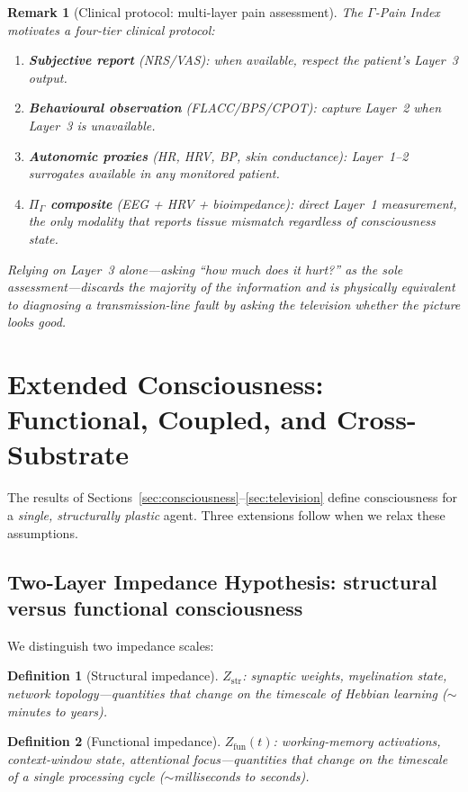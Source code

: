 \documentclass[aps,pre,twocolumn,superscriptaddress,floatfix]{revtex4-2}
\newtheorem{definition}{Definition}
\newtheorem{remark}{Remark}
\begin{document}
\begin{remark}[Clinical protocol: multi-layer pain assessment]
The $\Gamma$-Pain Index motivates a four-tier clinical
protocol:
\begin{enumerate}
  \item \textbf{Subjective report} (NRS/VAS):
    when available, respect the patient's Layer~3 output.
  \item \textbf{Behavioural observation}
    (FLACC/BPS/CPOT): capture Layer~2 when Layer~3 is
    unavailable.
  \item \textbf{Autonomic proxies}
    (HR, HRV, BP, skin conductance): Layer~1--2 surrogates
    available in any monitored patient.
  \item \textbf{$\Pi_{\Gamma}$ composite}
    (EEG + HRV + bioimpedance): direct Layer~1
    measurement, the only modality that reports tissue
    mismatch \emph{regardless of consciousness state}.
\end{enumerate}
Relying on Layer~3 alone---asking ``how much does it
hurt?'' as the sole assessment---discards the majority
of the information and is physically equivalent to
diagnosing a transmission-line fault by asking the
television whether the picture looks good.
\end{remark}


\section{Extended Consciousness: Functional, Coupled,
  and Cross-Substrate}
\label{sec:extended}

The results of Sections~\ref{sec:consciousness}--\ref{sec:television}
define consciousness for a \emph{single, structurally plastic}
agent.  Three extensions follow when we relax these assumptions.

\subsection{Two-Layer Impedance Hypothesis:
  structural versus functional consciousness}
\label{sec:two-layer}

We distinguish two impedance scales:
\begin{definition}[Structural impedance]
$Z_{\text{str}}$: synaptic weights, myelination state,
network topology---quantities that change on the timescale
of Hebbian learning ($\sim$minutes to years).
\end{definition}
\begin{definition}[Functional impedance]
$Z_{\text{fun}}(t)$: working-memory activations,
context-window state, attentional focus---quantities that
change on the timescale of a single processing cycle
($\sim$milliseconds to seconds).
\end{definition}
\end{document}
